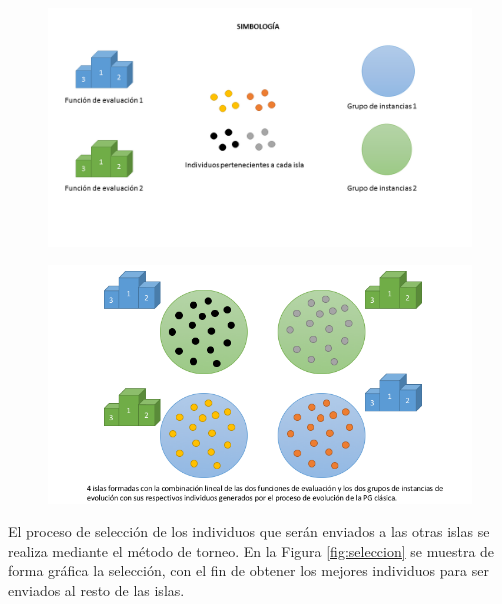 \begin{figure}[H]
    \centering
    \includegraphics[width=14cm]{images/cap3/simbologia.png}
    \label{fig:simbologia}
\end{figure}

\begin{figure}[H]
    \centering
    \includegraphics[width=14cm]{images/cap3/estructura.png}
    \label{fig:estructura}
\end{figure}


El proceso de selección de los individuos que serán enviados a las otras islas se realiza mediante el método de torneo. En la Figura \ref{fig:seleccion} se muestra de forma gráfica la selección, con el fin de obtener los mejores individuos para ser enviados al resto de las islas.

